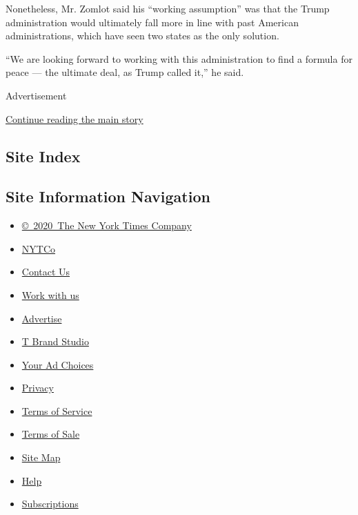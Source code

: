 Nonetheless, Mr. Zomlot said his ``working assumption'' was that the
Trump administration would ultimately fall more in line with past
American administrations, which have seen two states as the only
solution.

``We are looking forward to working with this administration to find a
formula for peace --- the ultimate deal, as Trump called it,'' he said.

Advertisement

\protect\hyperlink{after-bottom}{Continue reading the main story}

\hypertarget{site-index}{%
\subsection{Site Index}\label{site-index}}

\hypertarget{site-information-navigation}{%
\subsection{Site Information
Navigation}\label{site-information-navigation}}

\begin{itemize}
\tightlist
\item
  \href{https://help.nytimes3xbfgragh.onion/hc/en-us/articles/115014792127-Copyright-notice}{©~2020~The
  New York Times Company}
\end{itemize}

\begin{itemize}
\tightlist
\item
  \href{https://www.nytco.com/}{NYTCo}
\item
  \href{https://help.nytimes3xbfgragh.onion/hc/en-us/articles/115015385887-Contact-Us}{Contact
  Us}
\item
  \href{https://www.nytco.com/careers/}{Work with us}
\item
  \href{https://nytmediakit.com/}{Advertise}
\item
  \href{http://www.tbrandstudio.com/}{T Brand Studio}
\item
  \href{https://www.nytimes3xbfgragh.onion/privacy/cookie-policy\#how-do-i-manage-trackers}{Your
  Ad Choices}
\item
  \href{https://www.nytimes3xbfgragh.onion/privacy}{Privacy}
\item
  \href{https://help.nytimes3xbfgragh.onion/hc/en-us/articles/115014893428-Terms-of-service}{Terms
  of Service}
\item
  \href{https://help.nytimes3xbfgragh.onion/hc/en-us/articles/115014893968-Terms-of-sale}{Terms
  of Sale}
\item
  \href{https://spiderbites.nytimes3xbfgragh.onion}{Site Map}
\item
  \href{https://help.nytimes3xbfgragh.onion/hc/en-us}{Help}
\item
  \href{https://www.nytimes3xbfgragh.onion/subscription?campaignId=37WXW}{Subscriptions}
\end{itemize}
